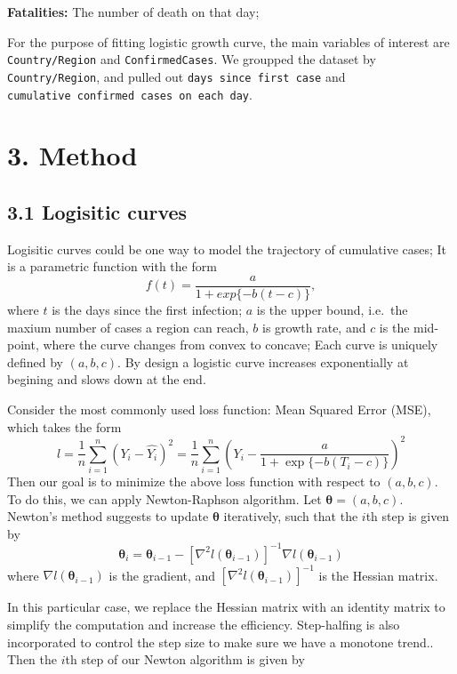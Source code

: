 \documentclass[
]{article}
\begin{document}
\textbf{Fatalities:} The number of death on that day;

For the purpose of fitting logistic growth curve, the main variables of
interest are \texttt{Country/Region} and \texttt{ConfirmedCases}. We
groupped the dataset by \texttt{Country/Region}, and pulled out
\texttt{days\ since\ first\ case} and
\texttt{cumulative\ confirmed\ cases\ on\ each\ day}.

\hypertarget{method}{%
\section{3. Method}\label{method}}

\hypertarget{logisitic-curves}{%
\subsection{3.1 Logisitic curves}\label{logisitic-curves}}

Logisitic curves could be one way to model the trajectory of cumulative
cases; It is a parametric function with the form
\[f(t) = \frac{a}{ 1+ exp\{-b(t-c)\}},\] where \(t\) is the days since
the first infection; \(a\) is the upper bound, i.e.~the maxium number of
cases a region can reach, \(b\) is growth rate, and \(c\) is the
mid-point, where the curve changes from convex to concave; Each curve is
uniquely defined by \((a,b,c)\). By design a logistic curve increases
exponentially at begining and slows down at the end.

Consider the most commonly used loss function: Mean Squared Error (MSE),
which takes the form \[
l = \frac{1}{n} \sum_{i=1}^n (Y_i - \hat{Y_i})^2  = \frac{1}{n} \sum_{i=1}^n (Y_i - \frac{a}{ 1+ \exp\{-b(T_i-c)\}})^2
\] Then our goal is to minimize the above loss function with respect to
\((a,b,c)\). To do this, we can apply Newton-Raphson algorithm. Let
\(\boldsymbol{\theta} = (a,b,c)\). Newton's method suggests to update
\(\boldsymbol{\theta}\) iteratively, such that the \(i\)th step is given
by \[
\boldsymbol{\theta}_i = \boldsymbol{\theta}_{i-1} -[\nabla^2 l(\boldsymbol{\theta}_{i-1})]^{-1} \nabla l(\boldsymbol{\theta}_{i-1})
\] where \(\nabla l(\boldsymbol{\theta}_{i-1})\) is the gradient, and
\([\nabla^2 l(\boldsymbol{\theta}_{i-1})]^{-1}\) is the Hessian matrix.

In this particular case, we replace the Hessian matrix with an identity
matrix to simplify the computation and increase the efficiency.
Step-halfing is also incorporated to control the step size to make sure
we have a monotone trend.. Then the \(i\)th step of our Newton algorithm
is given by
\end{document}

